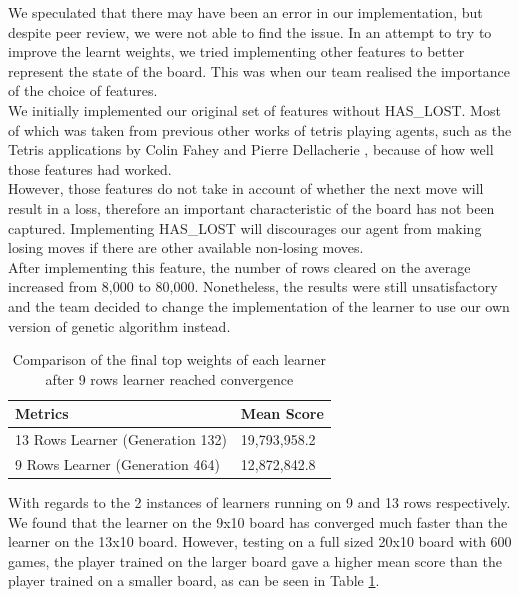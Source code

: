 \documentclass[a4paper,12pt,twocolumn]{article}
\begin{document}
We speculated that there may have been an error in our implementation, but despite
peer review, we were not able to find the issue. In an attempt to try to improve the
learnt weights, we tried implementing other features to better represent the state
of the board. This was when our team realised the importance of the choice of features.\\

We initially implemented our original set of features without HAS\_LOST. Most of which
was taken from previous other works of tetris playing agents, such as the Tetris
applications by Colin Fahey and Pierre Dellacherie \cite{colin_fahey}, because of
how well those features had worked.\\

However, those features do not take in account of whether the next move will result
in a loss, therefore an important characteristic of the board has not been captured.
Implementing HAS\_LOST will discourages our agent from making losing moves if
there are other available non-losing moves.\\

After implementing this feature, the number of rows cleared on the average increased
from 8,000 to 80,000. Nonetheless, the results were still unsatisfactory and the team
decided to change the implementation of the learner to use our own version of genetic
algorithm instead.

\begin{table}[h]
	\centering
	\begin{tabular}{|l|l|}
		\hline
		\textbf{Metrics}                 & \textbf{Mean Score} \\
		\hline
		13 Rows Learner (Generation 132) & 19,793,958.2        \\
		\hline
		9 Rows Learner (Generation 464)  & 12,872,842.8        \\
		\hline
	\end{tabular}
	\caption{
		Comparison of the final top weights of each learner after 9 rows learner
		reached convergence
	}
	\label{learner_comparison}
\end{table}

With regards to the 2 instances of learners running on 9 and 13 rows respectively.
We found that the learner on the 9x10 board has converged much faster than the
learner on the 13x10 board. However, testing on a full sized 20x10 board with 600 games,
the player trained on the larger board gave a higher mean score than the player
trained on a smaller board, as can be seen in Table \ref{learner_comparison}.\\
\end{document}
